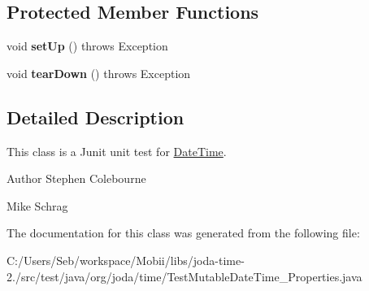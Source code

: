 \subsection*{Protected Member Functions}
\begin{DoxyCompactItemize}
\item 
\hypertarget{classorg_1_1joda_1_1time_1_1_test_mutable_date_time___properties_a2fa4965e7b4aec08a68b096164e2b2a7}{void {\bfseries set\-Up} ()  throws Exception }\label{classorg_1_1joda_1_1time_1_1_test_mutable_date_time___properties_a2fa4965e7b4aec08a68b096164e2b2a7}

\item 
\hypertarget{classorg_1_1joda_1_1time_1_1_test_mutable_date_time___properties_a248a179e6676566af6b02797ce5d4880}{void {\bfseries tear\-Down} ()  throws Exception }\label{classorg_1_1joda_1_1time_1_1_test_mutable_date_time___properties_a248a179e6676566af6b02797ce5d4880}

\end{DoxyCompactItemize}


\subsection{Detailed Description}
This class is a Junit unit test for \hyperlink{classorg_1_1joda_1_1time_1_1_date_time}{Date\-Time}.

\begin{DoxyAuthor}{Author}
Stephen Colebourne 

Mike Schrag 
\end{DoxyAuthor}


The documentation for this class was generated from the following file\-:\begin{DoxyCompactItemize}
\item 
C\-:/\-Users/\-Seb/workspace/\-Mobii/libs/joda-\/time-\/2./src/test/java/org/joda/time/Test\-Mutable\-Date\-Time\-\_\-\-Properties.\-java\end{DoxyCompactItemize}
